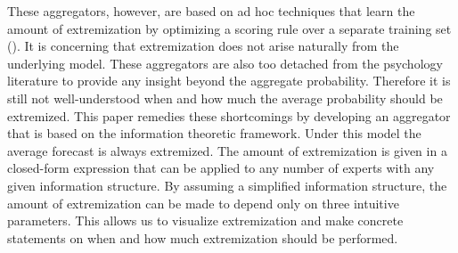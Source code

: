 \documentclass[11pt,twoside]{article}
\begin{document}

These aggregators, however, are based on ad hoc techniques that learn the amount of extremization by optimizing a scoring rule over a separate training set (\citet{Gneiting04strictlyproper}). It is concerning that extremization does not arise naturally from the underlying model. These aggregators are also too detached from the psychology literature to provide any insight beyond the aggregate probability. Therefore it is still not well-understood when and how much the average probability should be extremized. 
This paper remedies these shortcomings by developing an aggregator that is based on the information theoretic framework. Under this model the average forecast is always extremized. The amount of extremization is given in a closed-form expression that can be applied to any number of experts with any given information structure. By assuming a simplified information structure, the amount of extremization can be made to depend only on three intuitive parameters. This allows us to visualize extremization and make concrete statements on when and how much extremization should be performed. 
\end{document}
